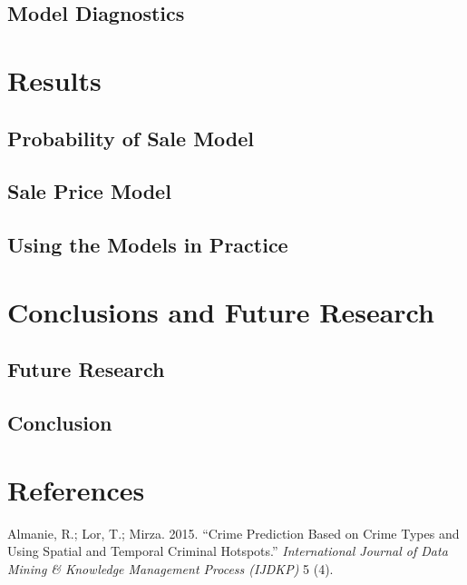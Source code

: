 \documentclass[]{article}
\begin{document}
\subsection{Model Diagnostics}\label{model-diagnostics}

\section{Results}\label{results}

\subsection{Probability of Sale Model}\label{probability-of-sale-model}

\subsection{Sale Price Model}\label{sale-price-model}

\subsection{Using the Models in
Practice}\label{using-the-models-in-practice}

\section{Conclusions and Future
Research}\label{conclusions-and-future-research}

\subsection{Future Research}\label{future-research}

\subsection{Conclusion}\label{conclusion}

\section*{References}\label{references}

\hypertarget{refs}{}
\hypertarget{ref-Almanie2015}{}
Almanie, R.; Lor, T.; Mirza. 2015. ``Crime Prediction Based on Crime
Types and Using Spatial and Temporal Criminal Hotspots.''
\emph{International Journal of Data Mining \& Knowledge Management
Process (IJDKP)} 5 (4).
\end{document}
